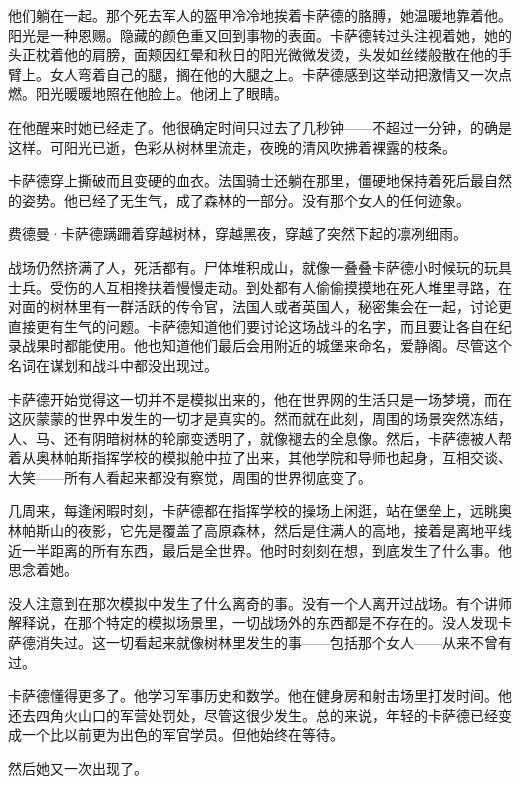 \documentclass[AutoFakeBold=true]{book}
\begin{document}
他们躺在一起。那个死去军人的盔甲冷冷地挨着卡萨德的胳膊，她温暖地靠着他。阳光是一种恩赐。隐藏的颜色重又回到事物的表面。卡萨德转过头注视着她，她的头正枕着他的肩膀，面颊因红晕和秋日的阳光微微发烫，头发如丝缕般散在他的手臂上。女人弯着自己的腿，搁在他的大腿之上。卡萨德感到这举动把激情又一次点燃。阳光暖暖地照在他脸上。他闭上了眼睛。

在他醒来时她已经走了。他很确定时间只过去了几秒钟——不超过一分钟，的确是这样。可阳光已逝，色彩从树林里流走，夜晚的清风吹拂着裸露的枝条。

卡萨德穿上撕破而且变硬的血衣。法国骑士还躺在那里，僵硬地保持着死后最自然的姿势。他已经了无生气，成了森林的一部分。没有那个女人的任何迹象。

费德曼·卡萨德蹒跚着穿越树林，穿越黑夜，穿越了突然下起的凛冽细雨。

战场仍然挤满了人，死活都有。尸体堆积成山，就像一叠叠卡萨德小时候玩的玩具士兵。受伤的人互相搀扶着慢慢走动。到处都有人偷偷摸摸地在死人堆里寻路，在对面的树林里有一群活跃的传令官，法国人或者英国人，秘密集会在一起，讨论更直接更有生气的问题。卡萨德知道他们要讨论这场战斗的名字，而且要让各自在纪录战果时都能使用。他也知道他们最后会用附近的城堡来命名，爱静阁。尽管这个名词在谋划和战斗中都没出现过。

卡萨德开始觉得这一切并不是模拟出来的，他在世界网的生活只是一场梦境，而在这灰蒙蒙的世界中发生的一切才是真实的。然而就在此刻，周围的场景突然冻结，人、马、还有阴暗树林的轮廓变透明了，就像褪去的全息像。然后，卡萨德被人帮着从奥林帕斯指挥学校的模拟舱中拉了出来，其他学院和导师也起身，互相交谈、大笑——所有人看起来都没有察觉，周围的世界彻底变了。

\vspace*{1em}

几周来，每逢闲暇时刻，卡萨德都在指挥学校的操场上闲逛，站在堡垒上，远眺奥林帕斯山的夜影，它先是覆盖了高原森林，然后是住满人的高地，接着是离地平线近一半距离的所有东西，最后是全世界。他时时刻刻在想，到底发生了什么事。他思念着她。

没人注意到在那次模拟中发生了什么离奇的事。没有一个人离开过战场。有个讲师解释说，在那个特定的模拟场景里，一切战场外的东西都是不存在的。没人发现卡萨德消失过。这一切看起来就像树林里发生的事——包括那个女人——从来不曾有过。

卡萨德懂得更多了。他学习军事历史和数学。他在健身房和射击场里打发时间。他还去四角火山口的军营处罚处，尽管这很少发生。总的来说，年轻的卡萨德已经变成一个比以前更为出色的军官学员。但他始终在等待。

然后她又一次出现了。

\vspace*{1em}
\end{document}
